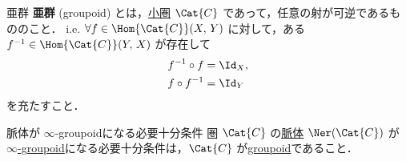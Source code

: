 \documentclass[TQFT_main]{subfiles}
\begin{document}
\begin{mydef}[label=def:groupoid]{亜群}
    \textbf{亜群} (groupoid) とは，\hyperref[def:category]{小圏} $\Cat{C}$ であって，任意の射が可逆であるもののこと．
    i.e. $\forall f \in \Hom{\Cat{C}} (X,\, Y)$ に対して，ある $f^{-1} \in \Hom{\Cat{C}} (Y,\, X)$ が存在して
    \begin{align}
        f^{-1} \circ f &= \Id_X, \\
        f \circ f^{-1} &= \Id_Y
    \end{align}
    を充たすこと．
\end{mydef}


\begin{myprop}[label=prop:nerve-grpd]{脈体が $\infty$-groupoidになる必要十分条件}
    圏 $\Cat{C}$ の\hyperref[def:nerve]{脈体} $\Ner (\Cat{C})$ が\hyperref[def:infinity-1]{$\infty$-groupoid}になる必要十分条件は，$\Cat{C}$ が\hyperref[def:groupoid]{groupoid}であること．
\end{myprop}
\end{document}
